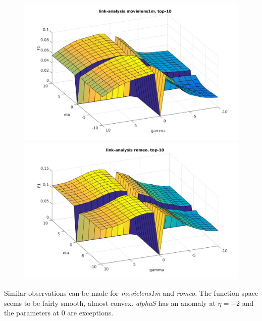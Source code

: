 \begin{figure}[h!]
\centering
\begin{minipage}{.5\textwidth}
    \centering
    \includegraphics[width=\linewidth]{fig/link_eta_gamma/movielens_link_eta.png}
\end{minipage}%
\begin{minipage}{.5\textwidth}
    \centering
    \includegraphics[width=\linewidth]{fig/link_eta_gamma/romeo_link_eta.png}
\end{minipage}
\end{figure}

Similar observations can be made for \textit{movielens1m} and \textit{romeo}. The function space seems to be fairly smooth, almost convex. \textit{alphaS} has an anomaly at $\eta = -2$ and the parameters at 0 are exceptions.

\FloatBarrier

